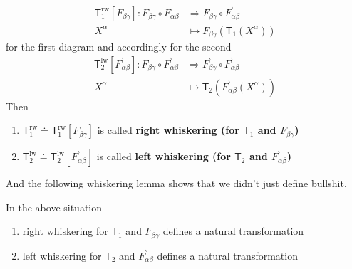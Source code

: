 \begin{align*}
  \mathsf{T}_{1}^{\mathrm{rw}}
  [F_{\beta\gamma}]
  \colon
  F_{\beta\gamma}
  \circ
  F_{\alpha\beta}
  &\Rightarrow
  F_{\beta\gamma}
  \circ
  F_{\alpha\beta}^{\backprime}
  \\
  X^{\alpha}
  &\mapsto
  F_{\beta\gamma}
  \left(
    \mathsf{T}_{1}(X^{\alpha})
  \right)
\end{align*}
for the first diagram and accordingly for the second
\begin{align*}
  \mathsf{T}_{2}^{\mathrm{lw}}
  [F_{\alpha\beta}^{\backprime}]
  \colon
  F_{\beta\gamma}
  \circ
  F_{\alpha\beta}^{\backprime}
  &\Rightarrow
  F_{\beta\gamma}^{\backprime}
  \circ
  F_{\alpha\beta}^{\backprime}
  \\
  X^{\alpha}
  &\mapsto
  \mathsf{T}_{2}
  \left(
    F_{\alpha\beta}^{\backprime}(X^{\alpha})
  \right)
\end{align*}
Then
\begin{enumerate}
\item[(a)]
$\mathsf{T}_{1}^{\mathrm{rw}} \doteq \mathsf{T}_{1}^{\mathrm{rw}}[F_{\beta\gamma}]$ is called \textbf{right whiskering (for $\mathsf{T}_{1}$ and $F_{\beta\gamma}$)}
\item[(b)]
$\mathsf{T}_{2}^{\mathrm{lw}} \doteq \mathsf{T}_{2}^{\mathrm{lw}}[F_{\alpha\beta}^{\backprime}]$ is called \textbf{left whiskering (for $\mathsf{T}_{2}$ and $F_{\alpha\beta}^{\backprime}$)}
\end{enumerate}
And the following whiskering lemma shows that we didn't just define bullshit.
\\
\begin{lem}[Whiskering]
\label{lem:whisk}
In the above situation
\begin{enumerate}
\item[(a)]
right whiskering for $\mathsf{T}_{1}$ and $F_{\beta\gamma}$ defines a natural transformation
\item[(b)]
left whiskering for $\mathsf{T}_{2}$ and $F_{\alpha\beta}^{\backprime}$ defines a natural transformation
\end{enumerate}
\end{lem}
